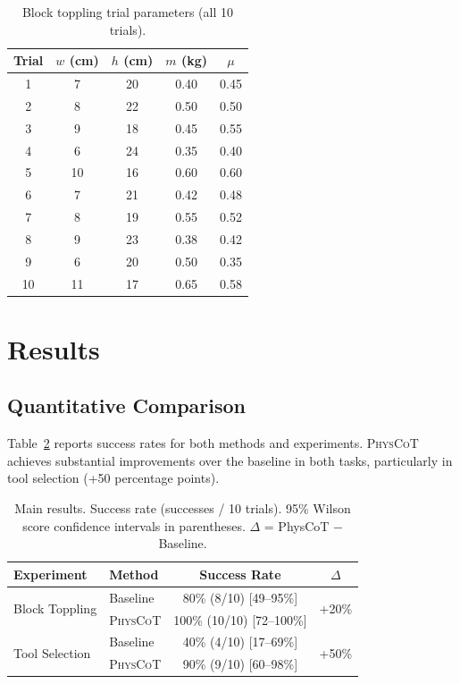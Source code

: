 \documentclass{article}
\newcommand{\physcot}{\textsc{PhysCoT}}
\begin{document}
\begin{table}[h]
\small
\centering
\caption{Block toppling trial parameters (all 10 trials).}
\label{tab:block_params}
\begin{tabular}{@{}ccccc@{}}
\toprule
Trial & $w$ (cm) & $h$ (cm) & $m$ (kg) & $\mu$ \\
\midrule
1  & 7  & 20 & 0.40 & 0.45 \\
2  & 8  & 22 & 0.50 & 0.50 \\
3  & 9  & 18 & 0.45 & 0.55 \\
4  & 6  & 24 & 0.35 & 0.40 \\
5  & 10 & 16 & 0.60 & 0.60 \\
6  & 7  & 21 & 0.42 & 0.48 \\
7  & 8  & 19 & 0.55 & 0.52 \\
8  & 9  & 23 & 0.38 & 0.42 \\
9  & 6  & 20 & 0.50 & 0.35 \\
10 & 11 & 17 & 0.65 & 0.58 \\
\bottomrule
\end{tabular}
\end{table}

\section{Results}
\label{sec:results}

\subsection{Quantitative Comparison}

Table~\ref{tab:main_results} reports success rates for both methods and experiments.
\physcot{} achieves substantial improvements over the baseline in both tasks,
particularly in tool selection (+50 percentage points).

\begin{table}[h]
\small
\centering
\caption{
  Main results. Success rate (successes / 10 trials).
  95\% Wilson score confidence intervals in parentheses.
  $\Delta$ = PhysCoT $-$ Baseline.
}
\label{tab:main_results}
\begin{tabular}{@{}llcc@{}}
\toprule
Experiment & Method & Success Rate & $\Delta$ \\
\midrule
\multirow{2}{*}{Block Toppling}
  & Baseline   & 80\% (8/10) [49--95\%] & \multirow{2}{*}{+20\%} \\
  & \physcot{} & 100\% (10/10) [72--100\%] & \\
\midrule
\multirow{2}{*}{Tool Selection}
  & Baseline   & 40\% (4/10) [17--69\%] & \multirow{2}{*}{+50\%} \\
  & \physcot{} & 90\% (9/10) [60--98\%] & \\
\bottomrule
\end{tabular}
\end{table}
\end{document}
